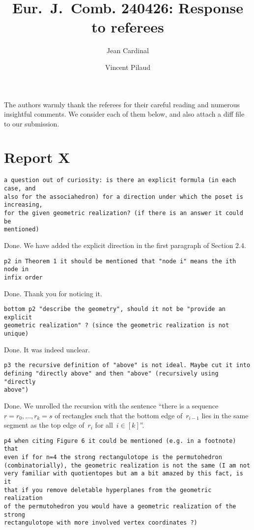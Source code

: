 \documentclass{article}
\title{Eur.~J.~Comb. 240426: Response to referees}
\author{Jean Cardinal \and Vincent Pilaud}
\begin{document}
\maketitle

The authors warmly thank the referees for their careful reading and numerous insightful comments. We consider each of them below, and also attach a diff file to our submission.

\section{Report X}

\begin{verbatim}
a question out of curiosity: is there an explicit formula (in each case, and 
also for the associahedron) for a direction under which the poset is increasing, 
for the given geometric realization? (if there is an answer it could be 
mentioned)
\end{verbatim}

Done. We have added the explicit direction in the first paragraph of Section 2.4.

\begin{verbatim}
p2 in Theorem 1 it should be mentioned that "node i" means the ith node in 
infix order
\end{verbatim}

Done. Thank you for noticing it.

\begin{verbatim}
bottom p2 "describe the geometry", should it not be "provide an explicit 
geometric realization" ? (since the geometric realization is not unique)
\end{verbatim}

Done. It was indeed unclear.

\begin{verbatim}
p3 the recursive definition of "above" is not ideal. Maybe cut it into 
defining "directly above" and then "above" (recursively using "directly 
above")
\end{verbatim}

Done. We unrolled the recursion with the sentence ``there is a sequence~${r = r_0, \dots, r_k = s}$ of rectangles such that the bottom edge of~$r_{i-1}$ lies in the same segment as the top edge of~$r_i$ for all~$i \in [k]$''.

\begin{verbatim}
p4 when citing Figure 6 it could be mentioned (e.g. in a footnote) that 
even if for n=4 the strong rectangulotope is the permutohedron 
(combinatorially), the geometric realization is not the same (I am not 
very familiar with quotientopes but am a bit amazed by this fact, is it 
that if you remove deletable hyperplanes from the geometric realization 
of the permutohedron you would have a geometric realization of the strong 
rectangulotope with more involved vertex coordinates ?)
\end{verbatim}
\end{document}
